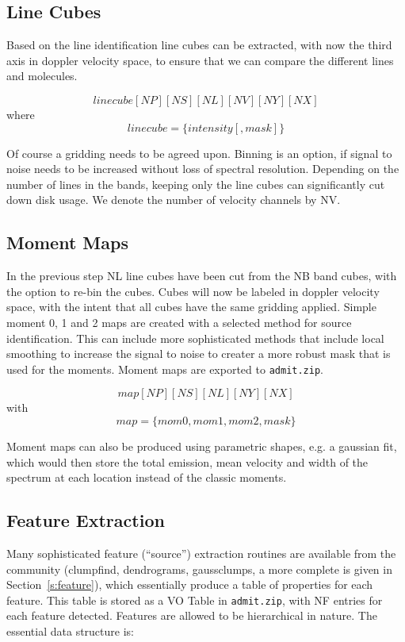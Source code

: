 \documentclass[preprint]{aastex} %
\begin{document}
\subsection{Line Cubes}

Based on the line identification  line cubes can be extracted,
with now the third axis in doppler velocity space, to ensure
that we can compare the different lines and molecules.

$$
     linecube[NP][NS][NL][NV][NY][NX]
$$
where 
$$
     linecube = \{ intensity [, mask] \}
$$

Of course a gridding needs to be agreed upon. Binning is an option,
if signal to noise needs to be increased without loss of  
spectral resolution. Depending on the number of lines in the bands,
keeping only the line cubes can significantly cut down disk usage.
We denote the number of velocity channels by NV. 

\subsection{Moment Maps}

In the previous step NL line cubes have been cut from the NB band cubes,
with the option to re-bin the cubes.
Cubes will now be labeled in doppler velocity space, with the intent
that all cubes have the same gridding applied.  Simple moment 0, 1 and 2 maps
are created with a selected method for source identification. This can 
include more sophisticated methods that include local smoothing to
increase the signal to noise to creater a more robust mask that is used
for the moments. Moment maps are exported to {\tt admit.zip}.

$$
    map[NP][NS][NL][NY][NX]
$$
with
$$
    map = \{mom0, mom1, mom2, mask\}
$$

Moment maps can also be produced using parametric shapes, e.g. a gaussian fit, which
would then store the total emission, mean velocity and width of the spectrum at each
location instead of the classic moments.

\subsection{Feature Extraction}

Many sophisticated feature (``source'') extraction routines are available from the community
(clumpfind, dendrograms, gaussclumps, a more complete is given in Section~\ref{s:feature}),
which essentially produce
a table of properties for each feature. This table is stored as a VO Table 
in {\tt admit.zip}, with NF entries for each feature detected. Features
are allowed to be hierarchical in nature. The essential data structure is:
\end{document}
